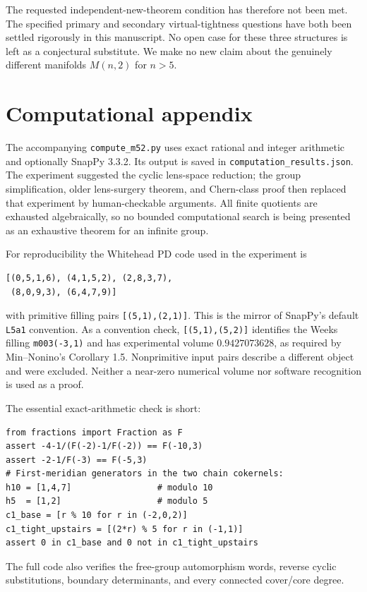 \documentclass[12pt]{amsart}
\theoremstyle{definition}
\theoremstyle{remark}
\numberwithin{equation}{section}
\theoremstyle{definition}
\begin{document}
The requested independent-new-theorem condition has therefore not been met. The specified primary and secondary virtual-tightness questions have both been settled rigorously in this manuscript. No open case for these three structures is left as a conjectural substitute. We make no new claim about the genuinely different manifolds $M(n,2)$ for $n>5$.

\section*{Computational appendix}
The accompanying \texttt{compute\_m52.py} uses exact rational and integer arithmetic and optionally SnapPy 3.3.2. Its output is saved in \texttt{computation\_results.json}. The experiment suggested the cyclic lens-space reduction; the group simplification, older lens-surgery theorem, and Chern-class proof then replaced that experiment by human-checkable arguments. All finite quotients are exhausted algebraically, so no bounded computational search is being presented as an exhaustive theorem for an infinite group.

For reproducibility the Whitehead PD code used in the experiment is
\begin{verbatim}
[(0,5,1,6), (4,1,5,2), (2,8,3,7),
 (8,0,9,3), (6,4,7,9)]
\end{verbatim}
with primitive filling pairs \texttt{[(5,1),(2,1)]}. This is the mirror of SnapPy's default \texttt{L5a1} convention. As a convention check, \texttt{[(5,1),(5,2)]} identifies the Weeks filling \texttt{m003(-3,1)} and has experimental volume $0.9427073628$, as required by Min--Nonino's Corollary 1.5. Nonprimitive input pairs describe a different object and were excluded. Neither a near-zero numerical volume nor software recognition is used as a proof.

The essential exact-arithmetic check is short:
\begin{verbatim}
from fractions import Fraction as F
assert -4-1/(F(-2)-1/F(-2)) == F(-10,3)
assert -2-1/F(-3) == F(-5,3)
# First-meridian generators in the two chain cokernels:
h10 = [1,4,7]                 # modulo 10
h5  = [1,2]                   # modulo 5
c1_base = [r % 10 for r in (-2,0,2)]
c1_tight_upstairs = [(2*r) % 5 for r in (-1,1)]
assert 0 in c1_base and 0 not in c1_tight_upstairs
\end{verbatim}
The full code also verifies the free-group automorphism words, reverse cyclic substitutions, boundary determinants, and every connected cover/core degree.
\end{document}
